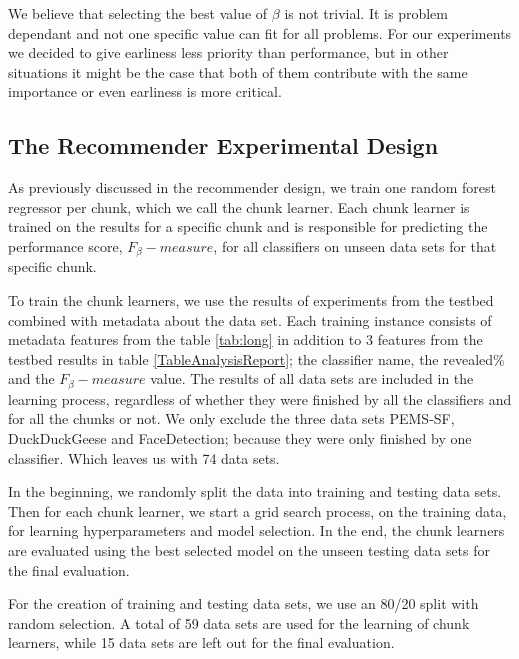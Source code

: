 We believe that selecting the best value of $\beta$ is not trivial.
It is problem dependant and not one specific value can fit for all problems.
For our experiments we decided to give earliness less priority than performance,
but in other situations it might be the case that both of them contribute with the same importance or even earliness is more critical.


\subsection{The Recommender Experimental Design}
\label{SubsectionRecommenderExperiment}
As previously discussed in the recommender design, we train one random forest regressor per chunk, which we call the chunk learner.
Each chunk learner is trained on the results for a specific chunk and is responsible for predicting the performance score, $F_{\beta}-measure$, for all classifiers on unseen data sets for that specific chunk.

To train the chunk learners, we use the results of experiments from the testbed combined with metadata about the data set.
Each training instance consists of metadata features from the table \ref{tab:long} in addition to 3 features from the testbed results in table \ref{TableAnalysisReport}; the classifier name, the revealed\% and the $F_{\beta}-measure$ value.
The results of all data sets are included in the learning process, regardless of whether they were finished by all the classifiers and for all the chunks or not.
We only exclude the three data sets PEMS-SF, DuckDuckGeese and FaceDetection; because they were only finished by one classifier. Which leaves us with 74 data sets.

In the beginning, we randomly split the data into training and testing data sets.
Then for each chunk learner, we start a grid search process, on the training data, for learning hyperparameters and model selection.
In the end, the chunk learners are evaluated using the best selected model on the unseen testing data sets for the final evaluation.

For the creation of training and testing data sets, we use an 80/20 split with random selection.
A total of 59 data sets are used for the learning of chunk learners, while 15 data sets are left out for the final evaluation.

